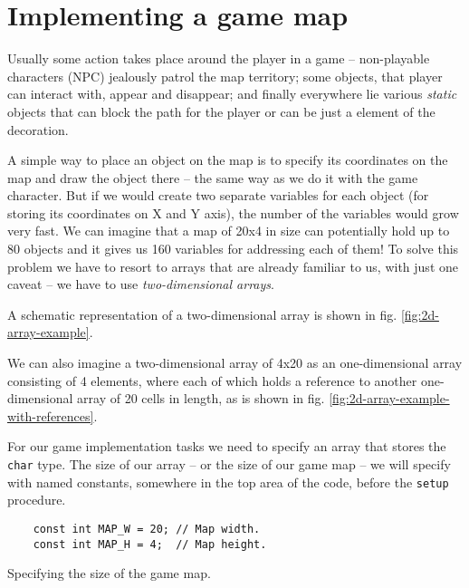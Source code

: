 \documentclass[../sparc.tex]{subfiles}
\begin{document}
\section{Implementing a game map}
\label{section:game-map}

Usually some action takes place around the player in a game -- non-playable
characters (NPC) jealously patrol the map territory; some objects, that player
can interact with, appear and disappear; and finally everywhere lie various
\emph{static} objects that can block the path for the player or can be just a
element of the decoration.

A simple way to place an object on the map is to specify its coordinates on the
map and draw the object there -- the same way as we do it with the game
character.  But if we would create two separate variables for each object (for
storing its coordinates on X and Y axis), the number of the variables would grow
very fast.  We can imagine that a map of 20x4 in size can potentially hold up to
80 objects and it gives us 160 variables for addressing each of them!  To solve
this problem we have to resort to arrays that are already familiar to us, with
just one caveat -- we have to use \emph{two-dimensional arrays}.

A schematic representation of a two-dimensional array is shown in
fig. \ref{fig:2d-array-example}.


We can also imagine a two-dimensional array of 4x20 as an one-dimensional array
consisting of 4 elements, where each of which holds a reference to another
one-dimensional array of 20 cells in length, as is shown in
fig. \ref{fig:2d-array-example-with-references}.


For our game implementation tasks we need to specify an array that stores the
\texttt{char} type.  The size of our array -- or the size of our game
map -- we will specify with named constants, somewhere in the top area of the
code, before the \texttt{setup} procedure.

\begin{listing}[H]
  \begin{verbatim}
    const int MAP_W = 20; // Map width.
    const int MAP_H = 4;  // Map height.
  \end{verbatim}
  \caption{Specifying the size of the game map.}
  \label{listing:game-dev-map-size}
\end{listing}
\end{document}
